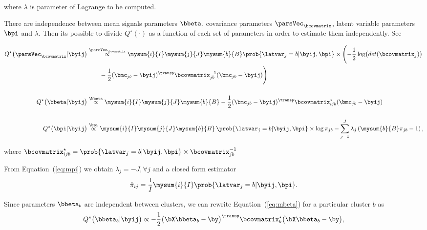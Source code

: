 \noindent where $\lambda$ is parameter of Lagrange to be computed.

There are independence between mean signals parameters $\bbeta$, covariance parameters $\parsVec_{\bcovmatrix}$, latent variable parameters $\bpi$ and $\lambda$. Then its possible to divide $Q^\star(\cdot)$ as a function of each set of parameters in order to estimate them independently. See

\begin{align}
  Q^\star
  \bigl(
  \parsVec_{\bcovmatrix}
  |
  \byij
  \bigr)
  &\overset{\boldsymbol \parsVec_{\bcovmatrix}}{\propto}
       \mysum{i}{I}
     \mysum{j}{J}
     \mysum{b}{B}
    \prob{\latvar_j = b | \byij, \bpi} \times %
     \Biggl(
  -\frac{1}{2} \log \bigl(det(\bcovmatrix_j) \bigr) \nonumber \\
  &\qquad
          -\frac{1}{2}
     (\bmc_{jb} - \byij)^\transp
     \bcovmatrix_{jb}^{-1}
     (\bmc_{jb} - \byij)
     \Biggr) \label{eq:msigma}\\[.5cm]
  Q^\star
  \bigl(
  \bbeta
  |
  \byij
  \bigr)
  &\overset{\boldsymbol \bbeta}{\propto}
     \mysum{i}{I}
     \mysum{j}{J}
     \mysum{b}{B}
  -\frac{1}{2}
  (\bmc_{jb} - \byij)^\transp
  \bcovmatrix_{ijb}^\star
    (\bmc_{jb} - \byij) \label{eq:mbeta}\\[.5cm]
  Q^\star
  \bigl(
  \bpi
  |
  \byij
  \bigr)
  &\overset{\boldsymbol \bpi}{\propto}
    \mysum{i}{I}
    \mysum{j}{J}
    \mysum{b}{B}\,
    \prob{\latvar_j = b | \byij, \bpi} \times
    \log \pi_{jb}
    -
    \sum_{j=1}^J
    \lambda_j
  \left(
    \mysum{b}{B} \pi_{jb} - 1
    \right), \label{eq:mpi}
\end{align}

\noindent where $\bcovmatrix_{ijb}^\star
    =
    \prob{\latvar_j = b | \byij, \bpi} \times 
  \bcovmatrix_{jb}^{-1}$

 From Equation~(\ref{eq:mpi}) we obtain $\lambda_j = -J, \forall j$ and a closed form estimator 
 \begin{equation}
   \hat{\pi}_{ij} = \frac{1}{I}
   \mysum{i}{I}
   \prob{\latvar_j = b | \byij, \bpi}.
   \label{eq:pihat}
 \end{equation}

 Since parameters $\bbeta_b$ are independent between clusters, we can rewrite Equation~(\ref{eq:mbeta}) for a particular cluster $b$ as
 \begin{equation}
   \label{eq:betahat1}
  Q^\star
  \bigl(
  \bbeta_b
  |
  \byij
  \bigr)
  \propto
  -\frac{1}{2}
  \bigl(
  \bX \bbeta_b - \by
  \bigr)^\transp
  \bcovmatrix_b^\star
  \bigl(
  \bX \bbeta_b - \by
  \bigr),  
\end{equation}

